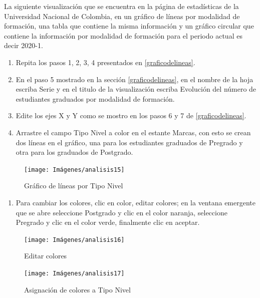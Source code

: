 \documentclass[
]{book}
\providecommand{\tightlist}{%
  \setlength{\itemsep}{0pt}\setlength{\parskip}{0pt}}
\begin{document}
La siguiente visualización que se encuentra en la página de estadísticas de la Universidad Nacional de Colombia, en un gráfico de líneas por modalidad de formación, una tabla que contiene la misma información y un gráfico circular que contiene la información por modalidad de formación para el periodo actual es decir 2020-1.

\begin{enumerate}
\def\labelenumi{\arabic{enumi}.}
\tightlist
\item
  Repita los pasos 1, 2, 3, 4 presentados en \ref{graficodelineas}.
\item
  En el paso 5 mostrado en la sección \ref{graficodelineas}, en el nombre de la hoja escriba Serie y en el titulo de la visualización escriba Evolución del número de estudiantes graduados por modalidad de formación.
\item
  Edite los ejes X y Y como se mostro en los pasos 6 y 7 de \ref{graficodelineas}.
\item
  Arrastre el campo Tipo Nivel a color en el estante Marcas, con esto se crean dos líneas en el gráfico, una para los estudiantes graduados de Pregrado y otra para los graduados de Postgrado.
\end{enumerate}

\begin{figure}

{\centering \texttt{[image: Imágenes/analisis15]} 

}

\caption{Gráfico de líneas por Tipo Nivel}\label{fig:paso4lineassegmentada-fig}
\end{figure}

\begin{enumerate}
\def\labelenumi{\arabic{enumi}.}
\setcounter{enumi}{4}
\tightlist
\item
  Para cambiar los colores, clic en color, editar colores; en la ventana emergente que se abre seleccione Postgrado y clic en el color naranja, seleccione Pregrado y clic en el color verde, finalmente clic en aceptar.
\end{enumerate}

\begin{figure}

{\centering \texttt{[image: Imágenes/analisis16]} 

}

\caption{Editar colores}\label{fig:paso5lineassegmentada-fig}
\end{figure}

\begin{figure}

{\centering \texttt{[image: Imágenes/analisis17]} 

}

\caption{Asignación de colores a Tipo Nivel}\label{fig:paso5-1lineassegmentada-fig}
\end{figure}
\end{document}
